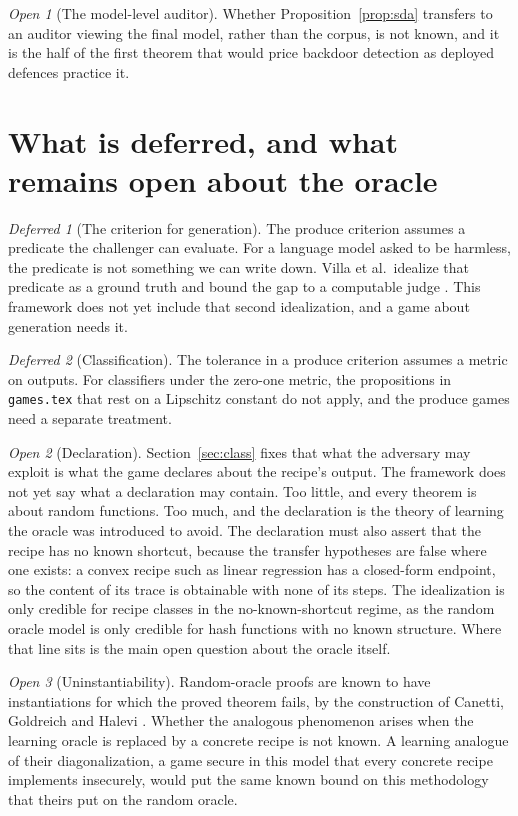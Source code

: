 \documentclass[11pt]{article}
\theoremstyle{definition}
\theoremstyle{plain}
\theoremstyle{remark}
\newtheorem{openq}{Open}
\newtheorem{deferred}{Deferred}
\begin{document}
\begin{openq}[The model-level auditor]
Whether Proposition~\ref{prop:sda} transfers to an auditor viewing the final
model, rather than the corpus, is not known, and it is the half of the first
theorem that would price backdoor detection as deployed defences practice it.
\end{openq}

\section{What is deferred, and what remains open about the oracle}

\begin{deferred}[The criterion for generation]
The produce criterion assumes a predicate the challenger can evaluate. For a
language model asked to be harmless, the predicate is not something we can write
down. Villa et al.\ idealize that predicate as a ground truth and bound the gap to a
computable judge \cite{VDKMR26}. This framework does not yet include that second
idealization, and a game about generation needs it.
\end{deferred}

\begin{deferred}[Classification]
The tolerance in a produce criterion assumes a metric on outputs. For classifiers
under the zero-one metric, the propositions in \texttt{games.tex} that rest on a
Lipschitz constant do not apply, and the produce games need a separate treatment.
\end{deferred}

\begin{openq}[Declaration]
Section~\ref{sec:class} fixes that what the adversary may exploit is what the game
declares about the recipe's output. The framework does not yet say what a
declaration may contain. Too little, and every theorem is about random functions.
Too much, and the declaration is the theory of learning the oracle was introduced
to avoid. The declaration must also assert that the recipe has no known shortcut,
because the transfer hypotheses are false where one exists: a convex recipe such as linear
regression has a closed-form endpoint, so the content of its trace is obtainable
with none of its steps. The idealization is only credible for recipe classes in
the no-known-shortcut regime, as the random oracle model is only credible for hash
functions with no known structure. Where that line sits is the main open question
about the oracle itself.
\end{openq}

\begin{openq}[Uninstantiability]
Random-oracle proofs are known to have instantiations for which the proved
theorem fails, by the construction of Canetti, Goldreich and Halevi \cite{CGH04}.
Whether the analogous phenomenon arises when the learning oracle is replaced by a
concrete recipe is not known. A learning analogue of their diagonalization, a game
secure in this model that every concrete recipe implements insecurely, would put
the same known bound on this methodology that theirs put on the random oracle.
\end{openq}



\end{document}
